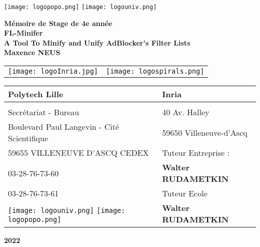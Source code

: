 \documentclass[oneside,a4paper,12pt]{article}
\begin{document}
	\begin{titlepage}
		\texttt{[image: logopopo.png]}
		\hspace*{\fill}
		\texttt{[image: logouniv.png]}
		
		\begin{center}
			\vspace{1cm}
			\textbf{Mémoire de Stage de 4e année}\\
			\vspace{1cm}
			\textbf{\LARGE FL-Minifer}\\
			\textbf{\large A Tool To Minify and Unify AdBlocker’s Filter Lists}\\
			\vspace{1cm}
			\textbf{Maxence NEUS}\\
			\vspace{1cm}
			\begin{tabular}{ c c }
				\texttt{[image: logoInria.jpg]} & \texttt{[image: logospirals.png]}\\
			\end{tabular}

			\vspace{2cm}

			\begin{tabular}{ m{6cm} | m{6cm} }
				\textbf{Polytech Lille} & \textbf{Inria} \\
				\hline
				& \\
				Secrétariat - Bureau & 40 Av. Halley \\
				Boulevard Paul Langevin - Cité Scientifique & 59650 Villeneuve-d'Ascq \\
				59655 VILLENEUVE D’ASCQ CEDEX & Tuteur Entreprise : \\
				03-28-76-73-60 & \textbf{Walter RUDAMETKIN} \\
				03-28-76-73-61 & Tuteur Ecole \\
				\texttt{[image: logouniv.png]} \texttt{[image: logopopo.png]} & \textbf{Walter RUDAMETKIN} \\
				
			\end{tabular}
			
			\vspace{\fill}
			\textbf{2022}\\
		\end{center}
	\end{titlepage}
\end{document}
